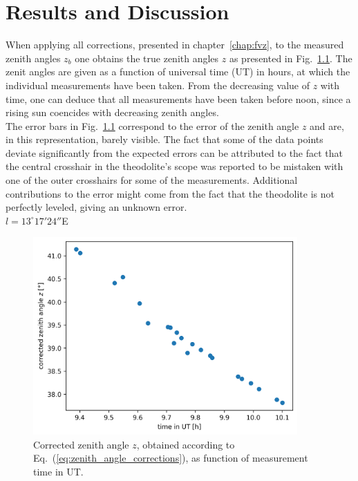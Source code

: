 
\chapter{Results and Discussion}

When applying all corrections, presented in chapter~\ref{chap:fvz}, to the measured zenith angles $z_b$ one obtains the true zenith angles $z$ as presented in Fig.~\ref{fig:zenith}. The zenit angles are given as a function of universal time (UT) in hours, at which the individual measurements have been taken. 
From the decreasing value of $z$ with time, one can deduce that all measurements have been taken before noon, since a rising sun coencides with decreasing zenith angles. \\ The error bars in Fig.~\ref{fig:zenith} correspond to the error of the zenith angle $z$ and are, in this representation, barely visible. The fact that some of the data points deviate significantly from the expected errors can be attributed to the fact that the central crosshair in the theodolite's scope was reported to be mistaken with one of the outer crosshairs for some of the measurements. Additional contributions to the error might come from the fact that the theodolite is not perfectly leveled, giving an unknown error.\\
$l=13^\circ 17' 24''$E

\begin{figure}[]
    \centering
    \includegraphics[width=0.9\textwidth]{05-Fazit/zenith_angle_plot.png}
    \caption{Corrected zenith angle $z$, obtained according to Eq.~(\ref{eq:zenith_angle_corrections}), as function of measurement time in UT.}
    \label{fig:zenith}
\end{figure}

\label{chap:fazit}


